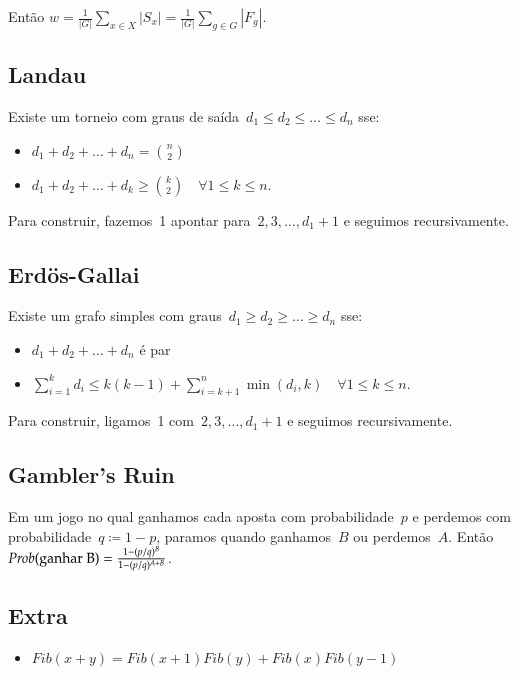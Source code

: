 \documentclass[a4paper,oneside]{article}
\begin{document}
Então $ w = \frac{1}{|G|} \sum\limits_{x \in X}{|S_x|} = \frac{1}{|G|} \sum\limits_{g \in G}{|F_g|}. $

\subsection{Landau}
Existe um torneio com graus de saída~$d_1 \leq d_2 \leq \ldots \leq d_n$ sse:
\begin{itemize}
\item $d_1 + d_2 + \ldots + d_n = {n \choose 2}$
\item $d_1 + d_2 + \ldots + d_k \geq {k \choose 2} \quad \forall 1 \leq k \leq n.$
\end{itemize}
Para construir, fazemos~1 apontar para~$2, 3, \ldots, d_1 + 1$ e seguimos recursivamente.

\subsection{Erdös-Gallai}
Existe um grafo simples com graus~$d_1 \geq d_2 \geq \ldots \geq d_n$ sse:
\begin{itemize}
\item $d_1 + d_2 + \ldots + d_n$ é par
\item $\sum\limits_{i = 1}^k{d_i} \leq k(k-1) + \sum\limits_{i=k+1}^n{\min(d_i, k)} \quad \forall 1 \leq k \leq n$.
\end{itemize}
Para construir, ligamos~1 com~$2, 3, \ldots, d_1 + 1$ e seguimos recursivamente.

\subsection{Gambler's Ruin}
Em um jogo no qual ganhamos cada aposta com probabilidade~$p$ e perdemos com probabilidade~$q \coloneqq 1 - p$, paramos quando ganhamos~$B$ ou perdemos~$A$. Então~$\mathit{Prob}(\textnormal{ganhar B}) = \frac{1 - (p/q)^B}{1 - (p/q)^{A+B}}$.

\subsection{Extra}
\newcommand{\Fib}{\mathit{Fib}}
\begin{itemize}
\item $\Fib(x + y) = \Fib(x + 1) \Fib(y) + \Fib(x) \Fib(y - 1)$
\end{itemize}
\end{document}
